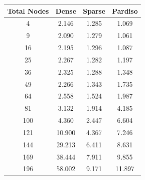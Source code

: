 \documentclass[letterpaper, 10 pt, conference]{ieeeconf}  %
\begin{document}
\begin{figure}
\begin{minipage}[b]{.45\linewidth}
                 \label{fig:tablecloth}
        \end{minipage}
        \begin{minipage}[b]{.45\linewidth}
                \begin{center}
                        \begin{tabular}{|c|c|c|c|}
                                \hline
                                \textbf{Total Nodes} & \textbf{Dense} & \textbf{Sparse} & \textbf{Pardiso} \\ \hline
                                4                    & 2.146          & 1.285           & 1.069            \\ \hline
                                9                    & 2.090          & 1.279           & 1.061            \\ \hline
                                16                   & 2.195          & 1.296           & 1.087            \\ \hline
                                25                   & 2.267          & 1.282           & 1.197            \\ \hline
                                36                   & 2.325          & 1.288           & 1.348            \\ \hline
                                49                   & 2.266          & 1.343           & 1.735            \\ \hline
                                64                   & 2.558          & 1.524           & 1.987            \\ \hline
                                81                   & 3.132          & 1.914           & 4.185            \\ \hline
                                100                  & 4.360          & 2.447           & 6.604            \\ \hline
                                121                  & 10.900         & 4.367           & 7.246            \\ \hline
                                144                  & 29.213         & 6.411           & 8.631            \\ \hline
                                169                  & 38.444         & 7.911           & 9.855            \\ \hline
                                196                  & 58.002         & 9.171           & 11.897           \\ \hline

\end{tabular}
\end{center}
\end{minipage}
\end{figure}
\end{document}
